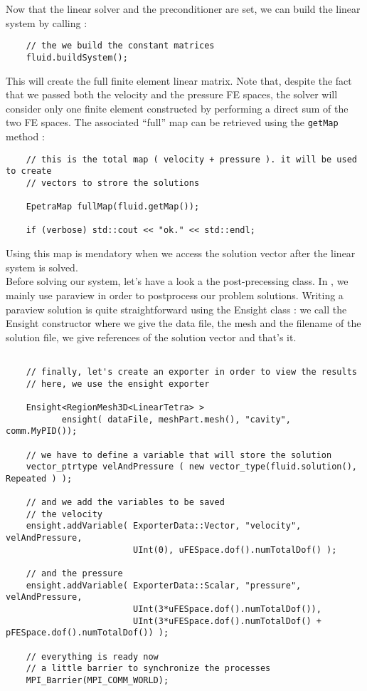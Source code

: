 Now that the linear solver and the preconditioner are set, we can build the linear system by calling :
\begin{verbatim}
    // the we build the constant matrices
    fluid.buildSystem();
\end{verbatim}

This will create the full finite element linear matrix. Note that, despite the fact
that we passed both the velocity and the pressure FE spaces, the solver will consider
only one finite element constructed by performing a direct sum of the two FE spaces.
The associated ``full'' map can be retrieved using the \verb|getMap| method :

\begin{verbatim}
    // this is the total map ( velocity + pressure ). it will be used to create
    // vectors to strore the solutions

    EpetraMap fullMap(fluid.getMap());

    if (verbose) std::cout << "ok." << std::endl;
\end{verbatim}

Using this map is mendatory when we access the solution vector after the linear system is solved.\\
Before solving our system, let's have a look a the post-precessing class.
In \lifev, we mainly use paraview in order to postprocess our problem solutions.
Writing a paraview solution is quite straightforward using the Ensight class :
we call the Ensight constructor where we give the data file, the mesh and the filename of the solution file,
we give references of the solution vector and that's it.

\begin{verbatim}

    // finally, let's create an exporter in order to view the results
    // here, we use the ensight exporter

    Ensight<RegionMesh3D<LinearTetra> >
           ensight( dataFile, meshPart.mesh(), "cavity", comm.MyPID());

    // we have to define a variable that will store the solution
    vector_ptrtype velAndPressure ( new vector_type(fluid.solution(), Repeated ) );

    // and we add the variables to be saved
    // the velocity
    ensight.addVariable( ExporterData::Vector, "velocity", velAndPressure,
                         UInt(0), uFESpace.dof().numTotalDof() );

    // and the pressure
    ensight.addVariable( ExporterData::Scalar, "pressure", velAndPressure,
                         UInt(3*uFESpace.dof().numTotalDof()),
                         UInt(3*uFESpace.dof().numTotalDof() + pFESpace.dof().numTotalDof()) );

    // everything is ready now
    // a little barrier to synchronize the processes
    MPI_Barrier(MPI_COMM_WORLD);
\end{verbatim}


